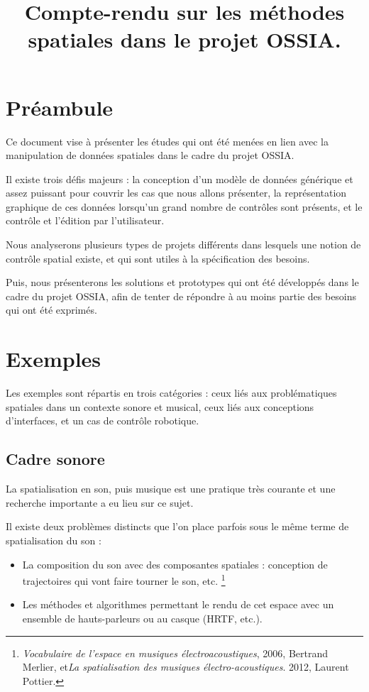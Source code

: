 \documentclass[french,12pt]{article}
\title{Compte-rendu sur les méthodes spatiales dans le projet OSSIA.}
\date{}
\begin{document}
    \maketitle

\section{Préambule}
Ce document vise à présenter les études qui ont été menées en lien avec 
la manipulation de données spatiales dans le cadre du projet OSSIA.

Il existe trois défis majeurs : la conception d'un modèle de données générique et assez puissant pour couvrir les cas que nous allons présenter, la représentation graphique de ces données lorsqu'un grand nombre de contrôles sont présents, et le contrôle et l'édition par l'utilisateur.

Nous analyserons plusieurs types de projets différents dans lesquels une notion
de contrôle spatial existe, et qui sont utiles à la spécification des besoins.

Puis, nous présenterons les solutions et prototypes qui ont été développés dans le cadre du projet OSSIA, afin de tenter de répondre à au moins partie des besoins qui ont été exprimés.

\section{Exemples}
Les exemples sont répartis en trois catégories : ceux liés aux problématiques spatiales dans un contexte sonore et musical, ceux liés aux conceptions d'interfaces, et un cas de contrôle robotique.

\subsection{Cadre sonore}
La spatialisation en son, puis musique est une pratique très courante et une recherche importante a eu lieu sur ce sujet.

Il existe deux problèmes distincts que l'on place parfois sous le même terme de spatialisation du son : 
\begin{itemize}
\item La composition du son avec des composantes spatiales : conception de trajectoires qui vont faire tourner le son, etc. \footnote{\textit{Vocabulaire de l'espace en musiques électroacoustiques}, 2006, Bertrand Merlier, et\textit{La spatialisation des musiques électro-acoustiques}. 2012, Laurent Pottier.}
\item Les méthodes et algorithmes permettant le rendu de cet espace avec un ensemble de hauts-parleurs ou au casque (HRTF, etc.).
\end{itemize}
\end{document}
